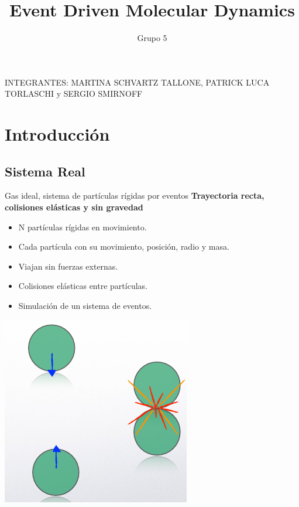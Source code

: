 \documentclass{beamer}
\title{Event Driven Molecular Dynamics}
\author{Grupo 5}
\institute{ITBA}
\date{} %
\begin{document}
\begin{frame}
  \titlepage
  \begin{center}
      \small INTEGRANTES: MARTINA SCHVARTZ TALLONE, PATRICK LUCA TORLASCHI y SERGIO SMIRNOFF
  \end{center}
\end{frame}

\section{Introducción}
\subsection{Sistema Real}
\begin{frame}{Gas ideal, sistema de partículas rígidas por eventos}
  \textbf{Trayectoria recta, colisiones elásticas y sin gravedad}
  \vspace{0.5cm}
  \begin{itemize}
    \item N partículas rígidas en movimiento.
    \item Cada partícula con su movimiento, posición, radio y masa.
    \item Viajan sin fuerzas externas.
    \item Colisiones elásticas entre partículas.
    \item Simulación de un sistema de eventos.
  \end{itemize}
  \begin{center}
    \includegraphics[width=0.3\linewidth]{photoMaterial/eventos_sistema_real.png}
  \end{center}
\end{frame}
\end{document}
